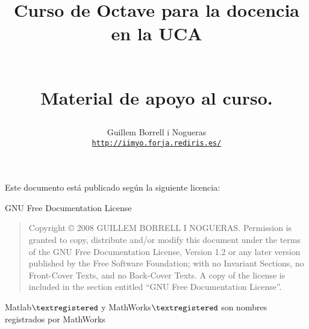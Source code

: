 \documentclass[10pt,fleqn,a4]{book}
\begin{document}
\lstset{language=Octave}
\title{\begin{Huge}Curso de Octave para la docencia en la
    UCA\end{Huge}\\ Material de apoyo al curso.}


\author{Guillem Borrell i Nogueras\\
  \texttt{\url{http://iimyo.forja.rediris.es/}}\\
}

\maketitle


Este documento está publicado según la siguiente licencia:
\begin{center}
\begin{Huge}
GNU Free Documentation License
\end{Huge}

\end{center}

\bigskip
\begin{quote}
    Copyright \copyright{}  2008  GUILLEM BORRELL I NOGUERAS.
    Permission is granted to copy, distribute and/or modify this document
    under the terms of the GNU Free Documentation License, Version 1.2
    or any later version published by the Free Software Foundation;
    with no Invariant Sections, no Front-Cover Texts, and no Back-Cover Texts.
    A copy of the license is included in the section entitled ``GNU
    Free Documentation License''.
\end{quote}

Matlab${\textregistered}$ y MathWorks${\textregistered}$ son nombres
registrados por MathWorks\\


\tableofcontents{}

\listoffigures





\end{document}
